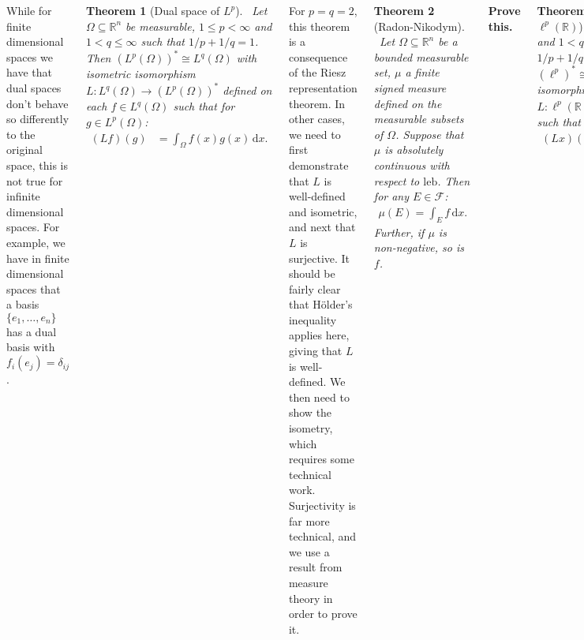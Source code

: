 \documentclass{tikzposter} %
\newtheorem{theorem}{Theorem}
\begin{document}
\begin{columns}
{    While for finite dimensional spaces we have that dual spaces don't behave so differently to the original space, this is not true for infinite dimensional spaces. For example, we have in finite dimensional spaces that a basis $\{e_{1},\dots,e_{n}\}$ has a dual basis with $f_{i}(e_{j}) = \delta_{ij}$. \\

    \begin{theorem}[Dual space of $L^{p}$]
    \ Let $\Omega \subseteq \mathbb{R}^{n}$ be measurable, $1 \le p < \infty$ and $1 < q \le \infty$ such that $1/p + 1/q = 1$. Then $(L^{p}(\Omega))^{*} \cong L^{q}(\Omega)$ with isometric isomorphism $L : L^{q}(\Omega) \to (L^{p}(\Omega))^{*}$ defined on each $f \in L^{q}(\Omega)$ such that for $g \in L^{p}(\Omega)$:
    \begin{align*}
      (Lf)(g) &= \int_{\Omega} f(x)g(x) \, \mathrm{d}x.
    \end{align*}
    \end{theorem}
    \hphantom{}

    For $p = q = 2$, this theorem is a consequence of the Riesz representation theorem. In other cases, we need to first demonstrate that $L$ is well-defined and isometric, and next that $L$ is surjective. It should be fairly clear that H\"{o}lder's inequality applies here, giving that $L$ is well-defined. We then need to show the isometry, which requires some technical work. \\

    Surjectivity is far more technical, and we use a result from measure theory in order to prove it. \\

    \begin{theorem}[Radon-Nikodym]
    \ Let $\Omega \subseteq \mathbb{R}^{n}$ be a bounded measurable set, $\mu$ a finite signed measure defined on the measurable subsets of $\Omega$. Suppose that $\mu$ is absolutely continuous with respect to $\mathrm{leb}$. Then for any $E \in \mathcal{F}$:
    \begin{align*}
      \mu(E) = \int_{E} f \, \mathrm{d}x.
    \end{align*}
    Further, if $\mu$ is non-negative, so is $f$.
    \end{theorem}
    \hphantom{}

    \textbf{Prove this.} \\

    \begin{theorem}[Dual space of $\ell^{p}(\mathbb{R})$]
    \ Let $1 \le p < \infty$ and $1 < q \le \infty$ be such that $1/p + 1/q = 1$. Then $(\ell^{p})^{*} \cong \ell^{q}$ with isometric isomorphism $L : \ell^{p}(\mathbb{R}) \to (\ell^{q}(\mathbb{R}))^{*}$ such that for $x \in \ell^{q}$, $y \in \ell^{p}$:
    \begin{align*}
      (Lx)(y) &= \sum_{j=1}^{\infty} x_{j}y_{j}.
    \end{align*}
    \end{theorem}
    \hphantom{}

}
\end{columns}
\end{document}
